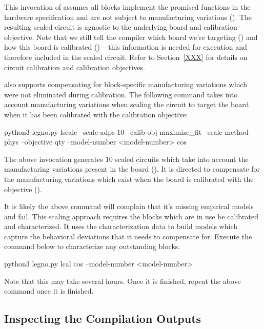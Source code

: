 This invocation of  assumes all blocks implement the promised
functions in the hardware specification and are not subject to manufacturing variations (). The
resulting scaled circuit is agnostic to the underlying board and calibration
objective. Note that we still tell the compiler which board we're targeting
() and how this board is calibrated
() -- this information is needed for execution
and therefore included in the scaled circuit. Refer to Section~\ref{XXX} for
details on circuit calibration and calibration objectives.

 also supports compensating for block-specific manufacturing
variations which were not eliminated during calibration. The following command
takes into account manufacturing variations when scaling the circuit to target
the board  when it has been calibrated with the
 calibration objective:


\begin{snippet}
  python3 legno.py lscale --scale-adps 10 --calib-obj maximize_fit
  --scale-method phys --objective qty --model-number <model-number> cos
\end{snippet}


The above invocation generates 10 scaled circuits which take into account the
manufacturing variations present in the board ().
It is directed to compensate for the manufacturing variations which exist when
the board is calibrated with the  objective ().

It is likely the above command will complain that it's missing empirical models
and fail. This scaling approach requires the blocks which are in use be
calibrated and characterized. It uses the characterization data to build models
which capture the behavioral deviations that it needs to compensate for. Execute
the command below to characterize any outstanding blocks.

\begin{snippet}
  python3 legno.py lcal cos --model-number <model-number>
\end{snippet}

Note that this may take several hours. Once it is finished, repeat the above
 command once it is finished.

\subsection{Inspecting the Compilation Outputs}

